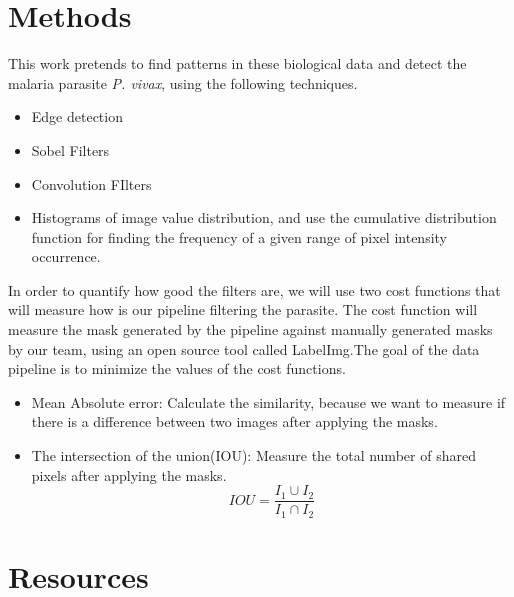\documentclass{article}
\begin{document}

\section{Methods}

This work pretends to  find patterns in these biological data and detect the malaria parasite \textit{P. vivax}, using the following techniques. 
\begin{itemize}
\item Edge detection
\item Sobel Filters
\item Convolution FIlters
\item Histograms of image value distribution, and use the cumulative distribution function for finding the frequency of a given range of pixel intensity occurrence.
\end{itemize}
In order to quantify how good the filters are, we will use two cost functions that will measure how is our pipeline filtering the parasite. The cost function will measure the mask generated by the pipeline against manually generated masks by our team, using an open source tool called LabelImg.The goal of the data pipeline is to minimize the values of the cost functions.
\begin{itemize}
\item Mean Absolute error: Calculate the similarity, because we want to measure if there is a difference between two images after applying the masks.
\item The intersection of the union(IOU): Measure the total number of shared pixels after applying the masks. \\  \begin{equation*}
  IOU = \frac{I_1 \cup I_2}{I_1 \cap I_2}
\end{equation*}
\end{itemize}


\section{Resources}
\end{document}
